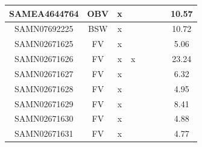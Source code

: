 \documentclass[../main.tex]{subfiles}
\begin{document}
\begin{flushleft}
\begin{footnotesize}
\begin{longtable}{|c|c|c|c|c|c|c|}
    \hline
    SAMEA4644764  & OBV   & x                                                            & ~          & ~                                                                           & ~                                                                 & 10.57     \\ 
    \hline
    SAMN07692225  & BSW   & x                                                            & ~          & ~                                                                           & ~                                                                 & 10.72     \\ 
    \hline
    SAMN02671625  & FV    & x                                                            & ~          & ~                                                                           & ~                                                                 & 5.06      \\ 
    \hline
    SAMN02671626  & FV    & x                                                            & x          & ~                                                                           & ~                                                                 & 23.24     \\ 
    \hline
    SAMN02671627  & FV    & x                                                            & ~          & ~                                                                           & ~                                                                 & 6.32      \\ 
    \hline
    SAMN02671628  & FV    & x                                                            & ~          & ~                                                                           & ~                                                                 & 4.95      \\ 
    \hline
    SAMN02671629  & FV    & x                                                            & ~          & ~                                                                           & ~                                                                 & 8.41      \\ 
    \hline
    SAMN02671630  & FV    & x                                                            & ~          & ~                                                                           & ~                                                                 & 4.88      \\ 
    \hline
    SAMN02671631  & FV    & x                                                            & ~          & ~                                                                           & ~                                                                 & 4.77      \\ 

\end{longtable}
\end{footnotesize}
\end{flushleft}
\end{document}

